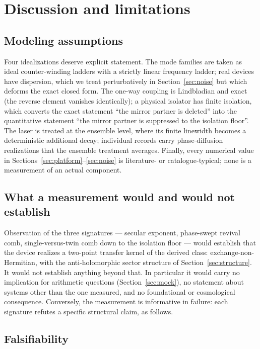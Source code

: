 \documentclass[11pt,a4paper]{article}
\begin{document}
\section{Discussion and limitations}
\label{sec:discussion}

\subsection{Modeling assumptions}

Four idealizations deserve explicit statement. The mode families are taken as
ideal counter-winding ladders with a strictly linear frequency ladder; real
devices have dispersion, which we treat perturbatively in
Section~\ref{sec:noise} but which deforms the exact closed form. The one-way
coupling is Lindbladian and exact (the reverse element vanishes identically); a
physical isolator has finite isolation, which converts the exact statement
``the mirror partner is deleted'' into the quantitative statement ``the mirror
partner is suppressed to the isolation floor''. The laser is treated at the
ensemble level, where its finite linewidth becomes a deterministic additional
decay; individual records carry phase-diffusion realizations that the ensemble
treatment averages. Finally, every numerical value in
Sections~\ref{sec:platform}--\ref{sec:noise} is literature- or
catalogue-typical; none is a measurement of an actual component.

\subsection{What a measurement would and would not establish}

Observation of the three signatures --- secular exponent, phase-swept revival
comb, single-versus-twin comb down to the isolation floor --- would establish
that the device realizes a two-point transfer kernel of the derived class:
exchange-non-Hermitian, with the anti-holomorphic sector structure of
Section~\ref{sec:structure}. It would not establish anything beyond that. In
particular it would carry no implication for arithmetic questions
(Section~\ref{sec:mock}), no statement about systems other than the one
measured, and no foundational or cosmological consequence. Conversely, the
measurement is informative in failure: each signature refutes a specific
structural claim, as follows.

\subsection{Falsifiability}
\end{document}
